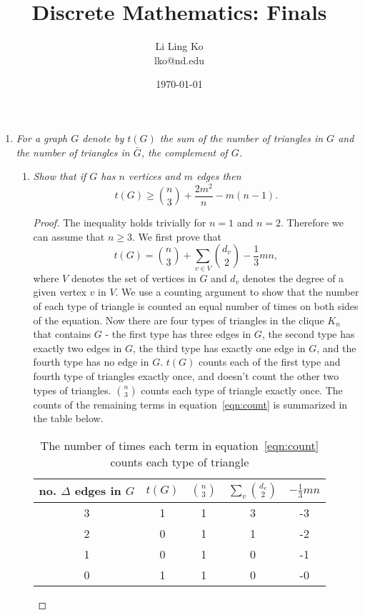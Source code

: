 \documentclass{article}
\begin{document}
\title{Discrete Mathematics: Finals}
\author{Li Ling Ko\\ lko@nd.edu}
\date{\today}
\maketitle

\begin{enumerate}
  \item \it For a graph $G$ denote by $t(G)$ the sum of the number of
    triangles in $G$ and the number of triangles in $\bar{G}$, the
    complement of $G$. 

    \begin{enumerate}
      \item \it Show that if $G$ has $n$ vertices and $m$ edges then
        \[t(G) \geq \binom{n}{3} +\frac{2m^2}{n} -m(n-1).\]

        \begin{proof}
          The inequality holds trivially for $n=1$ and $n=2$. Therefore we
          can assume that $n\geq3$. We first prove that
          \begin{equation}
            t(G) =\binom{n}{3} +\sum_{v\in V}\binom{d_v}{2} -\frac{1}{3}mn,
            \label{eqn:count}
          \end{equation}
          where $V$ denotes the set of vertices in $G$ and $d_v$ denotes
          the degree of a given vertex $v$ in $V$. We use a counting
          argument to show that the number of each type of triangle is
          counted an equal number of times on both sides of the equation.
          Now there are four types of triangles in the clique $K_n$ that
          contains $G$ - the first type has three edges in $G$, the second
          type has exactly two edges in $G$, the third type has exactly one
          edge in $G$, and the fourth type has no edge in $G$. $t(G)$
          counts each of the first type and fourth type of triangles
          exactly once, and doesn't count the other two types of triangles.
          $\binom{n}{3}$ counts each type of triangle exactly once. The
          counts of the remaining terms in equation~\eqref{eqn:count} is
          summarized in the table below.

          \begin{table}[ht]
            \begin{center}
              \begin{tabular}{c|cccc}
                no. $\Delta$ edges in $G$ &$t(G)$ &$\binom{n}{3}$
                  &$\sum_v\binom{d_v}{2}$ &$-\frac{1}{3}mn$\\
                \hline
                3 &1 &1 &3 &-3\\
                2 &0 &1 &1 &-2\\
                1 &0 &1 &0 &-1\\
                0 &1 &1 &0 &-0\\
              \end{tabular}
              \caption{The number of times each term in
              equation~\eqref{eqn:count} counts each type of triangle}
            \end{center}
          \end{table}


\end{proof}
\end{enumerate}
\end{enumerate}
\end{document}
